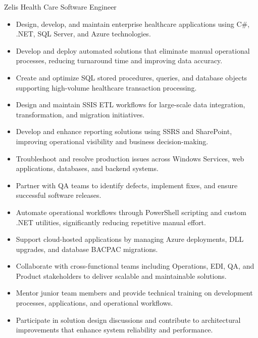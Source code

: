 \documentclass[letterpaper]{twentysecondcv} %
\begin{document}
{} %
{Zelis Health Care} %
{Software Engineer} %
{} %
\begin{itemize} \setlength \itemsep{0em} 
	\item Design, develop, and maintain enterprise healthcare applications using C\#, .NET, SQL Server, and Azure technologies. 
	\item Develop and deploy automated solutions that eliminate manual operational processes, reducing turnaround time and improving data accuracy. 
	\item Create and optimize SQL stored procedures, queries, and database objects supporting high-volume healthcare transaction processing. 
	\item Design and maintain SSIS ETL workflows for large-scale data integration, transformation, and migration initiatives. 
	\item Develop and enhance reporting solutions using SSRS and SharePoint, improving operational visibility and business decision-making. 
	\item Troubleshoot and resolve production issues across Windows Services, web applications, databases, and backend systems. 
	\item Partner with QA teams to identify defects, implement fixes, and ensure successful software releases. 
	\item Automate operational workflows through PowerShell scripting and custom .NET utilities, significantly reducing repetitive manual effort. 
	\item Support cloud-hosted applications by managing Azure deployments, DLL upgrades, and database BACPAC migrations. 
	\item Collaborate with cross-functional teams including Operations, EDI, QA, and Product stakeholders to deliver scalable and maintainable solutions. 
	\item Mentor junior team members and provide technical training on development processes, applications, and operational workflows. 
	\item Participate in solution design discussions and contribute to architectural improvements that enhance system reliability and performance. 
\end{itemize}
\end{document}
